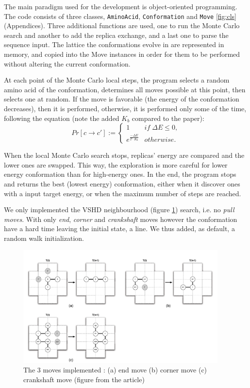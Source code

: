 \documentclass[a4paper, 12pt]{article}
\begin{document}
The main paradigm used for the development is object-oriented programming. The code consists of three classes, \texttt{AminoAcid}, \texttt{Conformation} and \texttt{Move} \ref{fig:cls} (Appendices). Three additional functions are used, one to run the Monte Carlo search and another to add the replica exchange, and a last one to parse the sequence input. The lattice the conformations evolve in are represented in memory, and copied into the Move instances in order for them to be performed without altering the current conformation.

At each point of the Monte Carlo local steps, the program selects a random amino acid of the conformation, determines all moves possible at this point, then selects one at random. If the move is favorable (the energy of the conformation decreases), then it is performed, otherwise, it is performed only some of the time, following the equation (note the added \(K_b\) compared to the paper):
$$Pr[c\rightarrow {c}'] := \left\{\begin{matrix}
    1 & if \; \Delta E\leq 0,\\
    e^{\frac{-\Delta E}{T\cdot K_b}} & otherwise.
    \end{matrix}\right.$$

When the local Monte Carlo search stops, replicas' energy are compared and the lower ones are swapped. This way, the exploration is more careful for lower energy conformation than for high-energy ones. In the end, the program stops and returns the best (lowest energy) conformation, either when it discover ones with a input target energy, or when the maximum number of steps are reached.

We only implemented the VSHD neighbourhood (figure \ref{fig:moves}) search, i.e. no \emph{pull moves}. With only \emph{end}, \emph{corner} and \emph{crankshaft} moves however the conformation have a hard time leaving the initial state, a line. We thus added, as default, a random walk initialization.



\begin{figure}[htbp]
\centering
\includegraphics[width=400px]{./vshd.png}
\caption{\label{fig:moves}The 3 moves implemented : (a) end move (b) corner move (c) crankshaft move (figure from the article)}
\end{figure}
\end{document}
